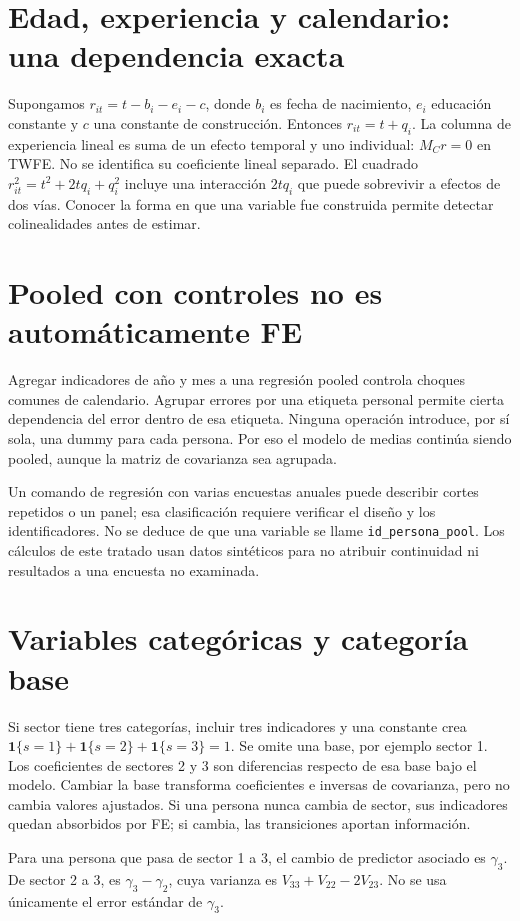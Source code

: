 \documentclass[11pt,a4paper]{article}
\newcommand{\ind}{\mathbf 1}
\theoremstyle{definition}
\begin{document}
\section{Edad, experiencia y calendario: una dependencia exacta}
Supongamos $r_{it}=t-b_i-e_i-c$, donde $b_i$ es fecha de nacimiento, $e_i$ educación constante y $c$ una constante de construcción.
Entonces $r_{it}=t+q_i$.
La columna de experiencia lineal es suma de un efecto temporal y uno individual:
$M_Cr=0$ en TWFE. No se identifica su coeficiente lineal separado.
El cuadrado
$r_{it}^2=t^2+2tq_i+q_i^2$
incluye una interacción $2tq_i$ que puede sobrevivir a efectos de dos vías.
Conocer la forma en que una variable fue construida permite detectar colinealidades antes de estimar.

\section{Pooled con controles no es automáticamente FE}
Agregar indicadores de año y mes a una regresión pooled controla choques comunes de calendario.
Agrupar errores por una etiqueta personal permite cierta dependencia del error dentro de esa etiqueta.
Ninguna operación introduce, por sí sola, una dummy para cada persona.
Por eso el modelo de medias continúa siendo pooled, aunque la matriz de covarianza sea agrupada.

Un comando de regresión con varias encuestas anuales puede describir cortes repetidos o un panel; esa clasificación requiere verificar el diseño y los identificadores.
No se deduce de que una variable se llame \texttt{id\_persona\_pool}.
Los cálculos de este tratado usan datos sintéticos para no atribuir continuidad ni resultados a una encuesta no examinada.

\section{Variables categóricas y categoría base}
Si sector tiene tres categorías, incluir tres indicadores y una constante crea
$\ind\{s=1\}+\ind\{s=2\}+\ind\{s=3\}=1$.
Se omite una base, por ejemplo sector 1. Los coeficientes de sectores 2 y 3 son diferencias respecto de esa base bajo el modelo.
Cambiar la base transforma coeficientes e inversas de covarianza, pero no cambia valores ajustados.
Si una persona nunca cambia de sector, sus indicadores quedan absorbidos por FE; si cambia, las transiciones aportan información.

Para una persona que pasa de sector 1 a 3, el cambio de predictor asociado es $\gamma_3$.
De sector 2 a 3, es $\gamma_3-\gamma_2$, cuya varianza es
$V_{33}+V_{22}-2V_{23}$.
No se usa únicamente el error estándar de $\gamma_3$.
\end{document}
